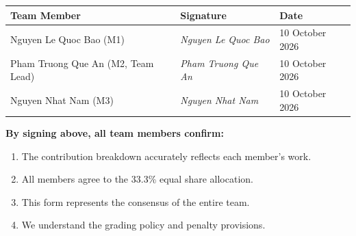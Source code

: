 \documentclass[11pt, a4paper]{article}
\begin{document}
\vspace{0.3cm}

\begin{tcolorbox}[formbox, title=\textbf{5. Formal Sign-Off}]
  \vspace{0.2cm}

  \begin{tabularx}{\linewidth}{@{}L{5.5cm} Z C{3.5cm}@{}}
    \toprule
    \textbf{Team Member} & \textbf{Signature} & \textbf{Date} \\
    \midrule
    Nguyen Le Quoc Bao (M1) & \textit{Nguyen Le Quoc Bao} & 10 October 2026 \\
    Pham Truong Que An (M2, Team Lead) & \textit{Pham Truong Que An} & 10 October 2026 \\
    Nguyen Nhat Nam (M3) & \textit{Nguyen Nhat Nam} & 10 October 2026 \\
    \bottomrule
  \end{tabularx}

  \vspace{0.5cm}
  \centering
  \textbf{By signing above, all team members confirm:}
  \begin{enumerate}
    \item The contribution breakdown accurately reflects each member's work.
    \item All members agree to the 33.3\% equal share allocation.
    \item This form represents the consensus of the entire team.
    \item We understand the grading policy and penalty provisions.
  \end{enumerate}
\end{tcolorbox}
\end{document}
